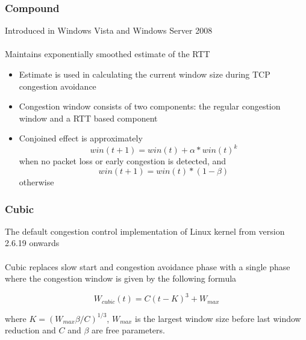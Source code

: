 \documentclass{beamer}
\begin{document}
\begin{frame}
\frametitle{Compound}
Introduced in Windows Vista and Windows Server 2008\\~\\

Maintains exponentially smoothed estimate of the RTT 
\begin{itemize}
	\item Estimate is used in calculating the current window size during TCP congestion avoidance
	\item Congestion window consists of two components: the regular congestion window and a RTT based component
	\item Conjoined effect is approximately
	\[
		win(t + 1) = win(t) + \alpha * win(t)^k
	\]
	when no packet loss or early congestion is detected, and
	\[
		win(t + 1) = win(t) * (1 - \beta)
	\]	
	otherwise
	  
\end{itemize}

\end{frame}

\begin{frame}
\frametitle{Cubic}
The default congestion control implementation of Linux kernel  from version 2.6.19 onwards\\~\\

Cubic replaces slow start and congestion avoidance phase with a single phase where the congestion window is given by the following formula

\[
W_{cubic}(t) = C(t - K)^3 + W_{max}   
\]

where $K = (W_{max} \beta / C)^{1 / 3}$, $W_{max}$ is the largest window size before last window reduction and $C$ and $\beta$ are free parameters.

\end{frame}
\end{document}
